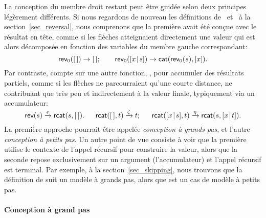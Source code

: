 La conception du membre droit restant peut
être guidée selon deux principes légèrement différents. Si nous
regardons de nouveau les définitions de~
 et~
à la section~\ref{sec_reversal}, nous comprenons que la première avait
été conçue avec le résultat en tête, comme si les flèches atteignaient
directement une valeur qui est alors décomposée en fonction des
variables du membre gauche correspondant:
\begin{equation*}
\textsf{rev}_0([\,]) \rightarrow [\,];\qquad
\textsf{rev}_0([{x}\!\mid\!{s}]) \rightarrow \textsf{cat}(\textsf{rev}_0(s),[x]).
\end{equation*}
Par contraste,
 compte sur une autre fonction,
, pour accumuler des résultats
partiels, comme si les flèches ne parcourraient qu'une courte
distance, ne contribuant que très peu et indirectement à la valeur
finale, typiquement via un accumulateur:
\begin{equation*}
\textsf{rev}(s) \xrightarrow{\smash{\epsilon}} \textsf{rcat}(s,[\,]).\quad\;\;
\textsf{rcat}([\,],t) \xrightarrow{\smash{\zeta}} t;\quad\;\;
\textsf{rcat}([{x}\!\mid\!{s}],t) \xrightarrow{\smash{\eta}} 
\textsf{rcat}(s,[{x}\!\mid\!{t}]).
\end{equation*}
La première approche pourrait être appelée \emph{conception à grands
  pas}, et l'autre \emph{conception à
  petits pas}. Un autre point de vue
consiste à voir que la première utilise le contexte de l'appel
récursif pour construire la valeur, alors que la seconde repose
exclusivement sur un argument (l'accumulateur) et l'appel récursif est terminal. Par
exemple, à la section~\ref{sec_skipping}, nous trouvons que la
définition de  suit un modèle à
grands pas, alors que  est
un cas de modèle à petits pas.

\paragraph{Conception à grand pas}
\label{big-step}

